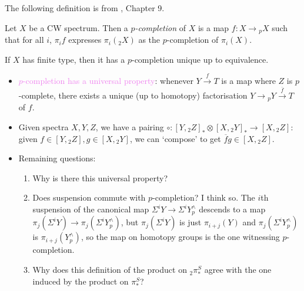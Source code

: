 \documentclass{MetricNotes2023}
\def\textcolour{\textcolor}
\begin{document}
The following definition is from \autocite{spectra}, Chapter 9.

\begin{definition}
Let \(X\) be a CW spectrum. Then a \textit{\(p\)-completion} of \(X\) is a map \(f : X \to \text{}_pX\) such that for all \(i\), \(\pi_if\) expresses \(\pi_i(\text{}_2X)\) as the \(p\)-completion of \(\pi_i(X)\).
\end{definition}

\begin{theorem}
If \(X\) has finite type, then it has a \(p\)-completion unique up to equivalence. 
\end{theorem}

\begin{itemize}
\item \textcolour{violet}{\(p\)-completion has a universal property}: whenever \(Y \xrightarrow{f} T\) is a map where \(Z\) is \(p\)-complete, there exists a unique (up to homotopy) factorisation \(Y\to \text{}_pY \xrightarrow{\overline f} T\) of \(f\). 

\item Given spectra \(X, Y, Z\), we have a pairing \(\circ : [Y, \text{}_2Z]_* \otimes [X,\text{}_2Y]_* \to [X, \text{}_2Z]\): given \(f \in [Y, \text{}_2Z], g \in [X, \text{}_2Y]\), we can `compose' to get \(\overline fg\in [X, \text{}_2Z]\). 

\item Remaining questions: \begin{enumerate}
\item Why is there this universal property? 

\item Does suspension commute with \(p\)-completion? I think so. The \(i\)th suspension of the canonical map \(\Sigma^i Y \to \Sigma^iY^\wedge_p\) descends to a map \(\pi_j(\Sigma^iY)\to \pi_j(\Sigma^iY^\wedge_p)\), but \(\pi_j(\Sigma^iY)\) is just \(\pi_{i+j}(Y)\) and \(\pi_{j}(\Sigma^i Y^\wedge_p)\) is \(\pi_{i+j}(Y^\wedge_p)\), so the map on homotopy groups is the one witnessing \(p\)-completion. 

\item Why does this definition of the product on \(\text{}_2\pi_*^S\) agree with the one induced by the product on \(\pi_*^S\)?


\end{enumerate}
\end{itemize}
\end{document}
